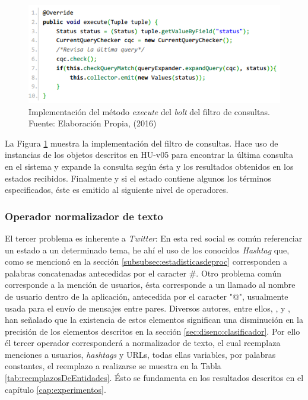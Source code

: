 \begin{figure}[H]
	\centering
	\captionsetup{justification=centering}
	\includegraphics[scale=0.8]{images/FilterBolt.png}
	\caption[Implementación del método \textit{execute} del \textit{bolt} del filtro de consultas.]{Implementación del método \textit{execute} del \textit{bolt} del filtro de consultas.\\Fuente: Elaboración Propia, (2016)}
	\label{fig:operadorFiltro}
\end{figure}

La Figura \ref{fig:operadorFiltro} muestra la implementación del filtro de consultas. Hace uso de instancias de los objetos descritos en HU-v05 para encontrar la última consulta en el sistema y expande la consulta según ésta y los resultados obtenidos en los estados recibidos. Finalmente y si el estado contiene algunos los términos especificados, éste es emitido al siguiente nivel de operadores.

\subsubsection*{Operador normalizador de texto}
\label{subsubsec:3op}

El tercer problema es inherente a \textit{Twitter}: En esta red social es común referenciar un estado a un determinado tema, he ahí el uso de los conocidos \textit{Hashtag} que, como se mencionó en la sección \ref{subsubsec:estadisticasdeproc} corresponden a palabras concatenadas antecedidas por el caracter \#. Otro problema común corresponde a la mención de usuarios, ésta corresponde a un llamado al nombre de usuario dentro de la aplicación, antecedida por el caracter "@", usualmente usada para el envío de mensajes entre pares. Diversos autores, entre ellos, \cite{NLPaccuracy}, \cite{NLPaccuracy1} y \cite{NLPaccuracy2}, han señalado que la existencia de estos elementos significan una disminución en la precisión de los elementos descritos en la sección \ref{sec:diseno:clasificador}. Por ello él tercer operador corresponderá a normalizador de texto, el cual reemplaza menciones a usuarios, \textit{hashtags} y URLs, todas ellas variables, por palabras constantes, el reemplazo a realizarse se muestra en la Tabla \ref{tab:reemplazosDeEntidades}. Ésto se fundamenta en los resultados descritos en el capítulo \ref{cap:experimentos}.

